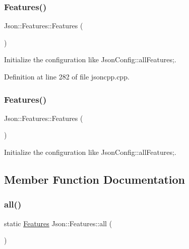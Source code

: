 \subsubsection{\texorpdfstring{Features()}{Features()}\hspace{0.1cm}{\footnotesize\ttfamily [1/2]}}
{\footnotesize\ttfamily Json\+::\+Features\+::\+Features (\begin{DoxyParamCaption}{ }\end{DoxyParamCaption})}



Initialize the configuration like Json\+Config\+::all\+Features;. 



Definition at line 282 of file jsoncpp.\+cpp.

\hypertarget{class_json_1_1_features_ad15a091cb61bb31323299a95970d2644}{}\label{class_json_1_1_features_ad15a091cb61bb31323299a95970d2644} 
\subsubsection{\texorpdfstring{Features()}{Features()}\hspace{0.1cm}{\footnotesize\ttfamily [2/2]}}
{\footnotesize\ttfamily Json\+::\+Features\+::\+Features (\begin{DoxyParamCaption}{ }\end{DoxyParamCaption})}



Initialize the configuration like Json\+Config\+::all\+Features;. 



\subsection{Member Function Documentation}
\hypertarget{class_json_1_1_features_a9f17db1b4ebbef8c645825344959481b}{}\label{class_json_1_1_features_a9f17db1b4ebbef8c645825344959481b} 
\subsubsection{\texorpdfstring{all()}{all()}\hspace{0.1cm}{\footnotesize\ttfamily [1/2]}}
{\footnotesize\ttfamily static \hyperlink{class_json_1_1_features}{Features} Json\+::\+Features\+::all (\begin{DoxyParamCaption}{ }\end{DoxyParamCaption})\hspace{0.3cm}{\ttfamily [static]}}



